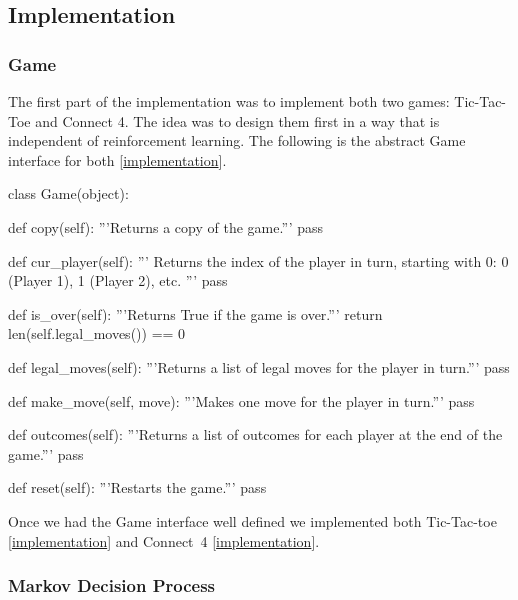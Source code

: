 \documentclass{article}
\newcommand{\GithubURL}[1]{[\href{https://github.com/davidrobles/mlnd-capstone-code/blob/master/#1}{implementation}]}
\begin{document}
\subsection{Implementation}

\subsubsection{Game}

The first part of the implementation was to implement both two games: Tic-Tac-Toe and Connect 4. The
idea was to design them first in a way that is independent of reinforcement learning. The following
is the abstract Game interface for both \GithubURL{capstone/game/game.py}.

\begin{python}
class Game(object):

    def copy(self):
        '''Returns a copy of the game.'''
        pass

    def cur_player(self):
        '''
        Returns the index of the player in turn, starting with 0:
        0 (Player 1), 1 (Player 2), etc.
        '''
        pass

    def is_over(self):
        '''Returns True if the game is over.'''
        return len(self.legal_moves()) == 0

    def legal_moves(self):
        '''Returns a list of legal moves for the player in turn.'''
        pass

    def make_move(self, move):
        '''Makes one move for the player in turn.'''
        pass

    def outcomes(self):
        '''Returns a list of outcomes for each player at the end of the game.'''
        pass

    def reset(self):
        '''Restarts the game.'''
        pass
\end{python}

Once we had the Game interface well defined we implemented both Tic-Tac-toe
\GithubURL{capstone/game/games/tictactoe.py} and \mbox{Connect 4}
\GithubURL{capstone/game/games/connect4.py}.

\subsubsection{Markov Decision Process}
\end{document}
